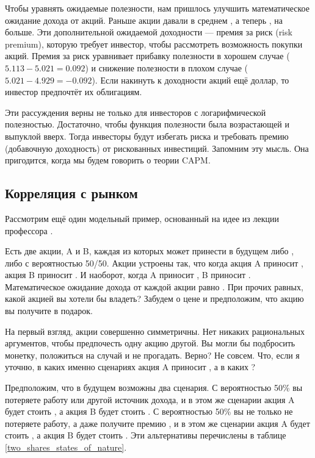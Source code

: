 Чтобы уравнять ожидаемые полезности, нам пришлось улучшить математическое 
ожидание дохода от акций. Раньше акции давали в среднем , а 
теперь , на  больше. Эти  
дополнительной ожидаемой доходности --- премия за риск (risk premium), которую 
требует инвестор, чтобы рассмотреть возможность покупки акций. Премия за риск 
уравнивает прибавку полезности в хорошем случае ($5.113 - 5.021 = 0.092$) и 
снижение полезности в плохом случае ($5.021 - 4.929 = -0.092$). Если накинуть к 
доходности акций ещё доллар, то инвестор предпочтёт их облигациям.
 
Эти рассуждения верны не только для инвесторов с логарифмической полезностью. 
Достаточно, чтобы функция полезности была возрастающей и выпуклой вверх. Тогда 
инвесторы будут избегать риска и требовать премию (добавочную доходность) от 
рискованных инвестиций. Запомним эту мысль. Она пригодится, когда мы будем 
говорить о теории CAPM.

\subsection{Корреляция с рынком}

Рассмотрим ещё один модельный пример, основанный на идее из лекции профессора
 \cite{cochrane2013consumption}.

Есть две акции, A и B, каждая из которых может принести в будущем либо 
, либо  с вероятностью 50/50. Акции устроены так, что 
когда акция A приносит , акция B приносит . И 
наоборот, когда A приносит , B приносит . 
Математическое ожидание дохода от каждой акции равно . При прочих 
равных, какой акцией вы хотели бы владеть? Забудем о цене и предположим, что 
акцию вы получите в подарок.

На первый взгляд, акции совершенно симметричны. Нет никаких рациональных 
аргументов, чтобы предпочесть одну акцию другой. Вы могли бы подбросить монетку, 
положиться на случай и не прогадать. Верно? Не совсем. Что, если я уточню, в 
каких именно сценариях акция A приносит , а в каких ?

Предположим, что в будущем возможны два сценария. С вероятностью 50\% вы 
потеряете работу или другой источник дохода, и в этом же сценарии акция A будет 
стоить , а акция B будет стоить . С вероятностью 50\% 
вы не только не потеряете работу, а даже получите премию , и в 
этом же сценарии акция A будет стоить , а акция B будет стоить 
. Эти альтернативы перечислены в таблице  
\ref{two_shares_states_of_nature}.

